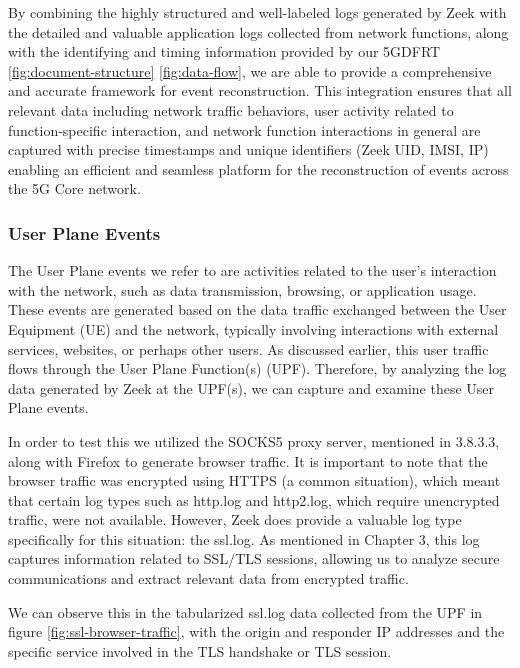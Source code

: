 \documentclass[final,1p,times,authoryear]{elsarticle}
\begin{document}
By combining the highly structured and well-labeled logs generated by Zeek with the detailed and valuable application logs collected from network functions, along with the identifying and timing information provided by our 5GDFRT \ref{fig:document-structure} \ref{fig:data-flow}, we are able to provide a comprehensive and accurate framework for event reconstruction. This integration ensures that all relevant data including network traffic behaviors, user activity related to function-specific interaction, and network function interactions in general are captured with precise timestamps and unique identifiers (Zeek UID, IMSI, IP) enabling an efficient and seamless platform for the reconstruction of events across the 5G Core network.

\subsubsection{User Plane Events}
\label{sub4sub2sec2}
The User Plane events we refer to are activities related to the user's interaction with the network, such as data transmission, browsing, or application usage. These events are generated based on the data traffic exchanged between the User Equipment (UE) and the network, typically involving interactions with external services, websites, or perhaps other users. As discussed earlier, this user traffic flows through the User Plane Function(s) (UPF). Therefore, by analyzing the log data generated by Zeek at the UPF(s), we can capture and examine these User Plane events.

\vspace{1em}

In order to test this we utilized the SOCKS5 proxy server, mentioned in 3.8.3.3, along with Firefox to generate browser traffic. It is important to note that the browser traffic was encrypted using HTTPS (a common situation), which meant that certain log types such as http.log and http2.log, which require unencrypted traffic, were not available. However, Zeek does provide a valuable log type specifically for this situation: the ssl.log. As mentioned in Chapter 3, this log captures information related to SSL/TLS sessions, allowing us to analyze secure communications and extract relevant data from encrypted traffic.

\vspace{1em}

We can observe this in the tabularized ssl.log data collected from the UPF in figure \ref{fig:ssl-browser-traffic}, with the origin and responder IP addresses and the specific service involved in the TLS handshake or TLS session.
\end{document}
